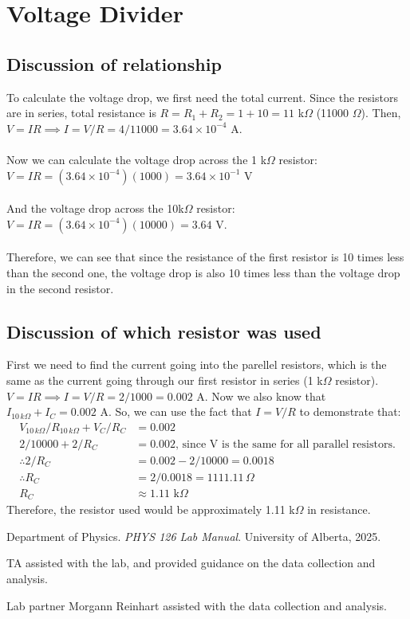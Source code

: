 \documentclass[12pt]{article}
\begin{document}
\section{Voltage Divider}
\subsection{Discussion of relationship}
To calculate the voltage drop, we first need the total current. Since the resistors are in series, total resistance is
$R = R_1 + R_2 = 1 + 10 = 11$ k$\Omega$ (11000 $\Omega$). Then, $V = IR \implies I = V/R = 4/11000 = 3.64 \times 10^{-4}$ A.
\\ \\
\noindent Now we can calculate the voltage drop across the 1 k$\Omega$ resistor: $V = IR = (3.64 \times 10^{-4}) (1000) = 3.64 \times 10^{-1}$ V
\\ \\ 
And the voltage drop across the 10k$\Omega$ resistor: $V = IR = (3.64 \times 10^{-4}) (10000) = 3.64$ V.
\\ \\
Therefore, we can see that since the resistance of the first resistor is 10 times less than the second one, the voltage
drop is also 10 times less than the voltage drop in the second resistor.

\subsection{Discussion of which resistor was used}
First we need to find the current going into the parellel resistors, which is the same as the current going through our first resistor in series (1 k$\Omega$ resistor).
$V = IR \implies I = V/R = 2/1000 = 0.002$ A. Now we also know that $I_{10\, k\Omega} + I_C = 0.002$ A.
So, we can use the fact that $I = V/R$ to demonstrate that:
\begin{align*}
    V_{10\,k\Omega}/R_{10\,k\Omega} + V_C/R_C &= 0.002 \\
    2/10000 + 2/R_C &= 0.002 \text{, since V is the same for all parallel resistors.} \\
    \therefore 2/R_C &= 0.002 - 2/10000 = 0.0018 \\
    \therefore R_C &= 2/0.0018 = 1111.11 \, \Omega\\
    R_C &\approx 1.11 \text{ k}\Omega
\end{align*}
Therefore, the resistor used would be approximately 1.11 k$\Omega$ in resistance.
\renewcommand{\refname}{References and Acknowledgements}
\begin{thebibliography}{9}
    Department of Physics. \textit{PHYS 126 Lab Manual}. University of Alberta, 2025.

    TA assisted with the lab, and provided guidance on the data collection and analysis.

    Lab partner Morgann Reinhart assisted with the data collection and analysis.
    
\end{thebibliography}
\end{document}
